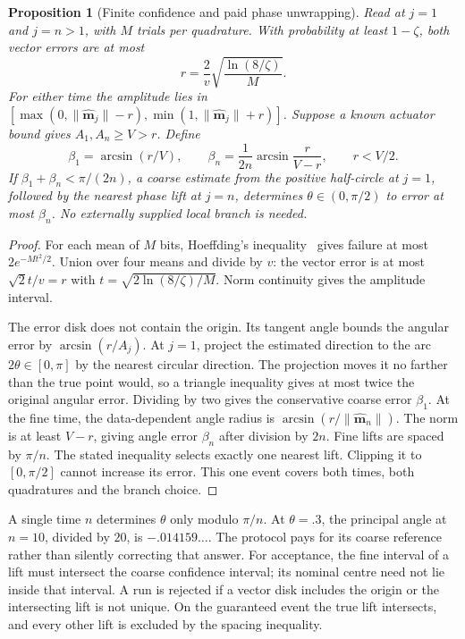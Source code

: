 \documentclass[12pt,a4paper]{article}
\newtheorem{proposition}[theorem]{Proposition}
\theoremstyle{definition}
\theoremstyle{remark}
\begin{document}
\begin{proposition}[Finite confidence and paid phase unwrapping]\label{prop:records}
Read at $j=1$ and $j=n>1$, with $M$ trials per quadrature. With probability at least $1-\zeta$, both vector errors are at most
\[
 r=\frac2v\sqrt{\frac{\ln(8/\zeta)}{M}} .
\]
For either time the amplitude lies in
$[\max(0,\|\widehat{\mathbf m}_j\|-r),\min(1,\|\widehat{\mathbf m}_j\|+r)]$.
Suppose a known actuator bound gives $A_1,A_n\ge V>r$. Define
\[
 \beta_1=\arcsin(r/V),\qquad
 \beta_n=\frac{1}{2n}\arcsin\!\frac{r}{V-r},
 \qquad r<V/2 .
\]
If $\beta_1+\beta_n<\pi/(2n)$, a coarse estimate from the positive half-circle at $j=1$, followed by the nearest phase lift at $j=n$, determines $\theta\in(0,\pi/2)$ to error at most $\beta_n$. No externally supplied local branch is needed.
\end{proposition}
\begin{proof}
For each mean of $M$ bits, Hoeffding's inequality~\cite{Hoeffding1963} gives failure at most $2e^{-Mt^2/2}$. Union over four means and divide by $v$: the vector error is at most $\sqrt2t/v=r$ with $t=\sqrt{2\ln(8/\zeta)/M}$. Norm continuity gives the amplitude interval.

The error disk does not contain the origin. Its tangent angle bounds the angular error by $\arcsin(r/A_j)$. At $j=1$, project the estimated direction to the arc $2\theta\in[0,\pi]$ by the nearest circular direction. The projection moves it no farther than the true point would, so a triangle inequality gives at most twice the original angular error. Dividing by two gives the conservative coarse error $\beta_1$. At the fine time, the data-dependent angle radius is $\arcsin(r/\|\widehat{\mathbf m}_n\|)$. The norm is at least $V-r$, giving angle error $\beta_n$ after division by $2n$. Fine lifts are spaced by $\pi/n$. The stated inequality selects exactly one nearest lift. Clipping it to $[0,\pi/2]$ cannot increase its error. This one event covers both times, both quadratures and the branch choice.
\end{proof}

A single time $n$ determines $\theta$ only modulo $\pi/n$. At $\theta=.3$, the principal angle at $n=10$, divided by $20$, is $-.014159\ldots$. The protocol pays for its coarse reference rather than silently correcting that answer. For acceptance, the fine interval of a lift must intersect the coarse confidence interval; its nominal centre need not lie inside that interval. A run is rejected if a vector disk includes the origin or the intersecting lift is not unique. On the guaranteed event the true lift intersects, and every other lift is excluded by the spacing inequality.
\end{document}
